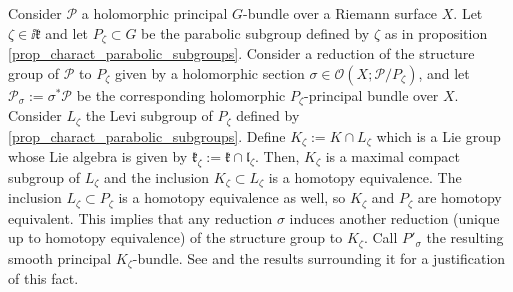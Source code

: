 Consider \(\mathcal{P}\) a holomorphic principal \(G\)-bundle over a Riemann surface \(X\). Let \(\zeta \in \ii \mathfrak{k}\) and let \(P_\zeta\subset G\) be the parabolic subgroup defined by \(\zeta\) as in proposition \ref{prop_charact_parabolic_subgroups}. Consider a reduction of the structure group of \(\mathcal{P}\) to \(P_\zeta\) given by a holomorphic section \(\sigma \in \mathcal{O}(X; \mathcal{P}/P_\zeta)\), and let \(\mathcal{P}_\sigma:=\sigma^*\mathcal{P}\) be the corresponding holomorphic \(P_\zeta\)-principal bundle over \(X\). Consider \(L_\zeta\) the Levi subgroup of \(P_\zeta\) defined by \ref{prop_charact_parabolic_subgroups}. Define \(K_\zeta:=K\cap L_\zeta\) which is a Lie group whose Lie algebra is given by \(\mathfrak{k}_\zeta:=\mathfrak{k}\cap \mathfrak{l}_\zeta\).  Then, \(K_\zeta\) is a maximal compact subgroup of \(L_\zeta\) and the inclusion \(K_\zeta \subset L_\zeta\) is a homotopy equivalence. The inclusion \(L_\zeta\subset P_\zeta\) is a homotopy equivalence as well, so \(K_\zeta\) and \(P_\zeta\) are homotopy equivalent. This implies that any reduction \(\sigma\) induces another reduction (unique up to homotopy equivalence) of the structure group to \(K_\zeta\). Call \(P'_\sigma\) the resulting smooth principal \(K_\zeta\)-bundle. See \parencite[Example 5.6]{kobayashi_vol1} and the results surrounding it for a justification of this fact.

